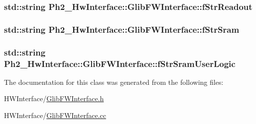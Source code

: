 \hypertarget{class_ph2___hw_interface_1_1_glib_f_w_interface_a1c2f018359fc0fc7f9652d6058ac94f1}{
\subsubsection[{f\-Str\-Readout}]{\setlength{\rightskip}{0pt plus 5cm}std\-::string Ph2\-\_\-\-Hw\-Interface\-::\-Glib\-F\-W\-Interface\-::f\-Str\-Readout\hspace{0.3cm}{\ttfamily [private]}}}\label{class_ph2___hw_interface_1_1_glib_f_w_interface_a1c2f018359fc0fc7f9652d6058ac94f1}
\hypertarget{class_ph2___hw_interface_1_1_glib_f_w_interface_a3fd05ec282e3485d13f3d4271f622039}{
\subsubsection[{f\-Str\-Sram}]{\setlength{\rightskip}{0pt plus 5cm}std\-::string Ph2\-\_\-\-Hw\-Interface\-::\-Glib\-F\-W\-Interface\-::f\-Str\-Sram\hspace{0.3cm}{\ttfamily [private]}}}\label{class_ph2___hw_interface_1_1_glib_f_w_interface_a3fd05ec282e3485d13f3d4271f622039}
\hypertarget{class_ph2___hw_interface_1_1_glib_f_w_interface_aee5e3a859a56e2ab7cead5100714851c}{
\subsubsection[{f\-Str\-Sram\-User\-Logic}]{\setlength{\rightskip}{0pt plus 5cm}std\-::string Ph2\-\_\-\-Hw\-Interface\-::\-Glib\-F\-W\-Interface\-::f\-Str\-Sram\-User\-Logic\hspace{0.3cm}{\ttfamily [private]}}}\label{class_ph2___hw_interface_1_1_glib_f_w_interface_aee5e3a859a56e2ab7cead5100714851c}


The documentation for this class was generated from the following files\-:\begin{DoxyCompactItemize}
\item 
H\-W\-Interface/\hyperlink{_glib_f_w_interface_8h}{Glib\-F\-W\-Interface.\-h}\item 
H\-W\-Interface/\hyperlink{_glib_f_w_interface_8cc}{Glib\-F\-W\-Interface.\-cc}\end{DoxyCompactItemize}
